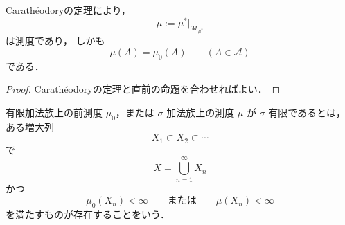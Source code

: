 \begin{corollary}[外測度から測度へ]
Carathéodoryの定理により，
\[
\mu:=\mu^*|_{\mathcal M_{\mu^*}}
\]
は測度であり，
しかも
\[
\mu(A)=\mu_0(A)\qquad (A\in\mathcal A)
\]
である．
\end{corollary}
\begin{proof}
Carathéodoryの定理と直前の命題を合わせればよい．
\end{proof}

\begin{definition}[$\sigma$-有限]
有限加法族上の前測度 $\mu_0$，または $\sigma$-加法族上の測度 $\mu$ が
$\sigma$-有限であるとは，ある増大列
\[
X_1 \subset X_2 \subset \cdots
\]
で
\[
X=\bigcup_{n=1}^{\infty}X_n
\]
かつ
\[
\mu_0(X_n)<\infty
\qquad
\text{または}
\qquad
\mu(X_n)<\infty
\]
を満たすものが存在することをいう．
\end{definition}

